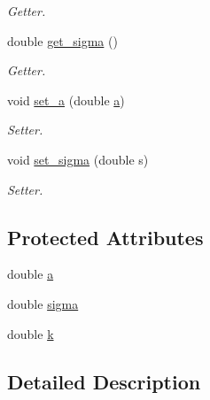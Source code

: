 \begin{DoxyCompactItemize}
\begin{DoxyCompactList}\small\item\em Getter. \end{DoxyCompactList}\item 
double \hyperlink{classcir_a3269ff6845cca07d9e99c139902fc3d4}{get\+\_\+sigma} ()\hypertarget{classcir_a3269ff6845cca07d9e99c139902fc3d4}{}\label{classcir_a3269ff6845cca07d9e99c139902fc3d4}

\begin{DoxyCompactList}\small\item\em Getter. \end{DoxyCompactList}\item 
void \hyperlink{classcir_a071e1fa837b80e16de53f82223725bdf}{set\+\_\+a} (double \hyperlink{classcir_a358578305ea60d31c00546233304651c}{a})\hypertarget{classcir_a071e1fa837b80e16de53f82223725bdf}{}\label{classcir_a071e1fa837b80e16de53f82223725bdf}

\begin{DoxyCompactList}\small\item\em Setter. \end{DoxyCompactList}\item 
void \hyperlink{classcir_a0f16e4b0fc9684e5ff41c7164bca2a2e}{set\+\_\+sigma} (double s)\hypertarget{classcir_a0f16e4b0fc9684e5ff41c7164bca2a2e}{}\label{classcir_a0f16e4b0fc9684e5ff41c7164bca2a2e}

\begin{DoxyCompactList}\small\item\em Setter. \end{DoxyCompactList}\end{DoxyCompactItemize}
\subsection*{Protected Attributes}
\begin{DoxyCompactItemize}
\item 
double \hyperlink{classcir_a358578305ea60d31c00546233304651c}{a}
\item 
double \hyperlink{classcir_a76df757acc0179e1cdf766ed6627efc9}{sigma}
\item 
double \hyperlink{classcir_aa5b05ff03ee8bb587ea94426a9ce704b}{k}
\end{DoxyCompactItemize}


\subsection{Detailed Description}
